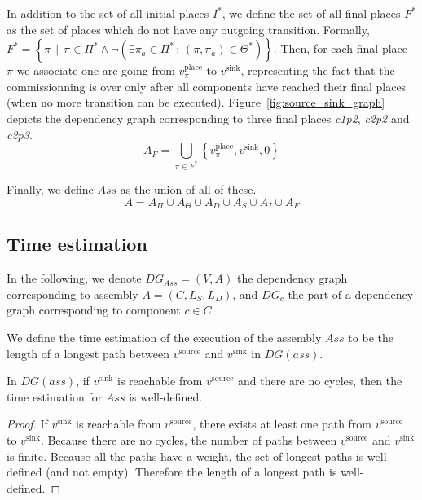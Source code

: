 In addition to the set of all initial places $I^*$, we define
the set of all final places $F^*$ as the set of places which
do not have any outgoing transition. Formally,
$F^*=\left\{ \pi\,\mid\,\pi\in\Pi^*\land\lnot\left(\exists\pi_{a}\in\Pi^*\,:\,\left(\pi,\pi_{a}\right)\in\Theta^*\right)\right\} $.
Then, for each final place $\pi$ we associate one arc going from
$v_\pi^\text{place}$ to $v^\text{sink}$, representing the fact that the
commissionning is over only after all components have reached their final places
(\ie when no more transition can be executed).
Figure~\ref{fig:source_sink_graph} depicts the dependency graph corresponding to three final
places \emph{c1p2}, \emph{c2p2} and \emph{c2p3}.
\[
A_F=\bigcup_{\pi\in F^*}\left\{ v_\pi^\text{place},v^\text{sink},0\right\} 
\]



Finally, we define $Ass$ as the union of all of these. 
\[
A=A_\Pi\cup A_{\Theta}\cup A_{D}\cup A_{S}\cup A_{I}\cup A_{F}
\]

\subsection{Time estimation}

In the following, we denote $DG_{Ass}=(V,A)$ the dependency graph corresponding
to assembly $A=(C,L_S,L_D)$, and $DG_c$ the part of a dependency graph
corresponding to component $c \in C$.

We define the time estimation of the execution of the \mad assembly $Ass$
to be the length of a longest path between $v^\text{source}$ and
$v^\text{sink}$ in $DG(ass)$.

\begin{lemma}
 In $DG(ass)$, if $v^\text{sink}$ is reachable from $v^\text{source}$ and there
 are no cycles, then the time estimation for $Ass$ is well-defined.
 \label{lemma:well_defined}
\end{lemma}

\begin{proof}
 If $v^\text{sink}$ is reachable from $v^\text{source}$, there exists at least
 one path from $v^\text{source}$ to  $v^\text{sink}$. Because there are no
 cycles, the number of paths between $v^\text{source}$ and $v^\text{sink}$ is
 finite. Because all the paths have a weight, the set of longest paths is
 well-defined (and not empty). Therefore the length of a longest path is
 well-defined.
\end{proof}

